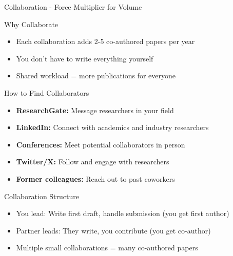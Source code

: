 \documentclass[11pt]{beamer}
\begin{document}
	\begin{frame}{Collaboration - Force Multiplier for Volume}
		\scriptsize
		\begin{block}{Why Collaborate}
			\begin{itemize}
				\item Each collaboration adds 2-5 co-authored papers per year
				\item You don't have to write everything yourself
				\item Shared workload = more publications for everyone
			\end{itemize}
		\end{block}
		\begin{block}{How to Find Collaborators}
			\begin{itemize}
				\item \textbf{ResearchGate:} Message researchers in your field
				\item \textbf{LinkedIn:} Connect with academics and industry researchers
				\item \textbf{Conferences:} Meet potential collaborators in person
				\item \textbf{Twitter/X:} Follow and engage with researchers
				\item \textbf{Former colleagues:} Reach out to past coworkers
			\end{itemize}
		\end{block}
		\begin{block}{Collaboration Structure}
			\begin{itemize}
				\item You lead: Write first draft, handle submission (you get first author)
				\item Partner leads: They write, you contribute (you get co-author)
				\item Multiple small collaborations = many co-authored papers
			\end{itemize}
		\end{block}
	\end{frame}
	
\end{document}
